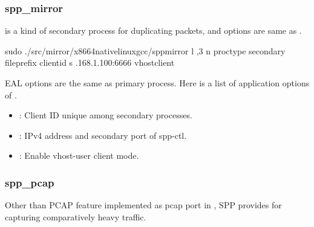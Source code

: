 \documentclass[a4paper,11pt,openany,oneside,english]{sphinxmanual}
\begin{document}
\subsubsection{spp\_mirror}
\label{\detokenize{gsg/howto_use:spp-mirror}}
 is a kind of secondary process for duplicating packets,
and options are same as .

\begin{sphinxVerbatim}[commandchars=\\\{\},formatcom=\footnotesize]
 sudo ./src/mirror/x86\PYGZus{}64\PYGZhy{}native\PYGZhy{}linux\PYGZhy{}gcc/spp\PYGZus{}mirror 
    \PYGZhy{}l ,3 \PYGZhy{}n  
    \PYGZhy{}\PYGZhy{}proc\PYGZhy{}type secondary 
    \PYGZhy{}\PYGZhy{}file\PYGZhy{}prefix  
    \PYGZhy{}\PYGZhy{} 
    \PYGZhy{}\PYGZhy{}client\PYGZhy{}id  
    \PYGZhy{}s .168.1.100:6666 
    \PYGZhy{}\PYGZhy{}vhost\PYGZhy{}client
\end{sphinxVerbatim}

EAL options are the same as primary process. Here is a list of application
options of .
\begin{itemize}
\item {} 
: Client ID unique among secondary processes.

\item {} 
: IPv4 address and secondary port of spp-ctl.

\item {} 
: Enable vhost-user client mode.

\end{itemize}


\subsubsection{spp\_pcap}
\label{\detokenize{gsg/howto_use:spp-pcap}}\label{\detokenize{gsg/howto_use:spp-vf-gsg-howto-use-spp-pcap}}
Other than PCAP feature implemented as pcap port in ,
SPP provides  for capturing comparatively heavy traffic.
\end{document}
